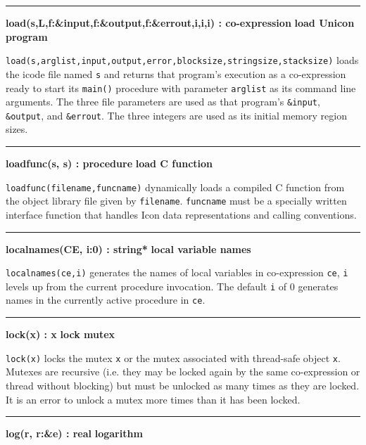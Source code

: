\bigskip\hrule\vspace{0.1cm}
\noindent
{\bf load(s,L,f:\&input,f:\&output,f:\&errout,i,i,i) : co-expression } \hfill {\bf load Unicon program}

\noindent
{}
\texttt{load(s,arglist,input,output,error,blocksize,stringsize,stacksize)}
loads the icode file named \texttt{s} and returns that
program's execution as a co-expression ready to start
its \texttt{main()} procedure with parameter \texttt{arglist} as its
command line arguments. The three file parameters are used as that
program's \texttt{\&input}, \texttt{\&output}, and
\texttt{\&errout}. The three integers are used as its initial memory
region sizes.

\bigskip\hrule\vspace{0.1cm}
\noindent
{\bf loadfunc(s, s) : procedure } \hfill {\bf load C function}

\noindent
{}\texttt{loadfunc(filename,funcname)} dynamically
loads a compiled C function from the object library file given by
\texttt{filename}. \texttt{funcname} must be a specially written
interface function that handles Icon data representations and calling
conventions.

\bigskip\hrule\vspace{0.1cm}
\noindent
{\bf localnames(CE, i:0) : string* } \hfill {\bf local variable names}

\noindent
{}\texttt{localnames(ce,i)} generates the
names of local variables in co-expression \texttt{ce}, \texttt{i}
levels up from the current procedure invocation. The default \texttt{i} of 0
generates names in the currently active procedure in \texttt{ce}.

\bigskip\hrule\vspace{0.1cm}
\noindent
{\bf lock(x) : x } \hfill {\bf lock mutex}

\noindent
{}\texttt{lock(x)} locks the mutex \texttt{x} or the mutex
associated with thread-safe object \texttt{x}.
Mutexes are recursive (i.e. they may be locked again by the same co-expression
or thread without blocking) but must be unlocked as many times as they are
locked. It is an error to unlock a mutex more times than it has been locked.

\bigskip\hrule\vspace{0.1cm}
\noindent
{\bf log(r, r:\&e) : real } \hfill {\bf logarithm}

